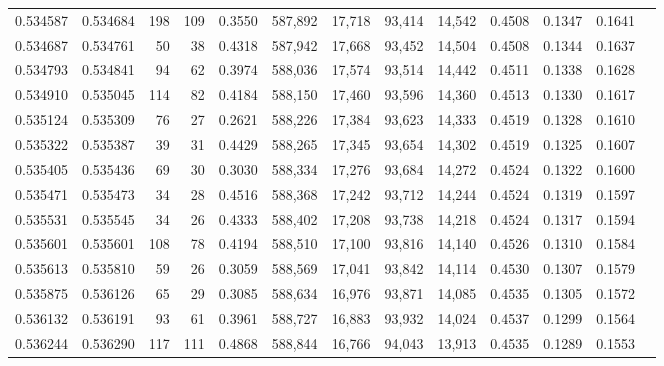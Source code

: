 \begin{tabular}{rrrrrrrrrrrrr}
0.534587 & 0.534684 &   198 &   109 &                                     0.3550 & 587,892 &  17,718 &  93,414 &  14,542 & 0.4508 & 0.1347 & 0.1641 \\
0.534687 & 0.534761 &    50 &    38 &                                     0.4318 & 587,942 &  17,668 &  93,452 &  14,504 & 0.4508 & 0.1344 & 0.1637 \\
0.534793 & 0.534841 &    94 &    62 &                                     0.3974 & 588,036 &  17,574 &  93,514 &  14,442 & 0.4511 & 0.1338 & 0.1628 \\
0.534910 & 0.535045 &   114 &    82 &                                     0.4184 & 588,150 &  17,460 &  93,596 &  14,360 & 0.4513 & 0.1330 & 0.1617 \\
0.535124 & 0.535309 &    76 &    27 &                                     0.2621 & 588,226 &  17,384 &  93,623 &  14,333 & 0.4519 & 0.1328 & 0.1610 \\
0.535322 & 0.535387 &    39 &    31 &                                     0.4429 & 588,265 &  17,345 &  93,654 &  14,302 & 0.4519 & 0.1325 & 0.1607 \\
0.535405 & 0.535436 &    69 &    30 &                                     0.3030 & 588,334 &  17,276 &  93,684 &  14,272 & 0.4524 & 0.1322 & 0.1600 \\
0.535471 & 0.535473 &    34 &    28 &                                     0.4516 & 588,368 &  17,242 &  93,712 &  14,244 & 0.4524 & 0.1319 & 0.1597 \\
0.535531 & 0.535545 &    34 &    26 &                                     0.4333 & 588,402 &  17,208 &  93,738 &  14,218 & 0.4524 & 0.1317 & 0.1594 \\
0.535601 & 0.535601 &   108 &    78 &                                     0.4194 & 588,510 &  17,100 &  93,816 &  14,140 & 0.4526 & 0.1310 & 0.1584 \\
0.535613 & 0.535810 &    59 &    26 &                                     0.3059 & 588,569 &  17,041 &  93,842 &  14,114 & 0.4530 & 0.1307 & 0.1579 \\
0.535875 & 0.536126 &    65 &    29 &                                     0.3085 & 588,634 &  16,976 &  93,871 &  14,085 & 0.4535 & 0.1305 & 0.1572 \\
0.536132 & 0.536191 &    93 &    61 &                                     0.3961 & 588,727 &  16,883 &  93,932 &  14,024 & 0.4537 & 0.1299 & 0.1564 \\
0.536244 & 0.536290 &   117 &   111 &                                     0.4868 & 588,844 &  16,766 &  94,043 &  13,913 & 0.4535 & 0.1289 & 0.1553 \\

\end{tabular}

